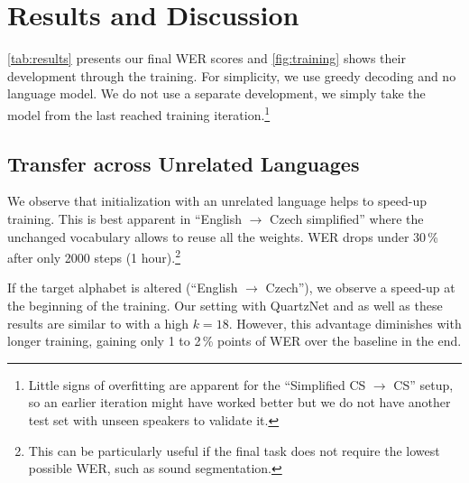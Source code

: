 \section{Results and Discussion}
\label{sec:results}


\cref{tab:results} presents our final WER scores and \cref{fig:training} shows their development through the training. For simplicity, we use greedy decoding and no language model. We do not use a separate development,
we simply take the model from the last reached training iteration.\footnote{Little signs of overfitting are apparent for the ``Simplified CS $\rightarrow$ CS'' setup, so an earlier iteration might have worked better but we do not have another test set with unseen speakers to validate it.}

\subsection{Transfer across Unrelated Languages}

We observe that initialization %
with an unrelated language helps to speed-up training. This is best apparent in ``English $\rightarrow$ Czech simplified'' where the unchanged vocabulary allows to reuse all the weights. WER drops under 30\,\%  after only 2000 steps (1 hour).\footnote{This can be particularly useful if the final task does not require the lowest possible WER, such as sound segmentation.}


If the target alphabet is altered (``English $\rightarrow$ Czech''), we observe a speed-up at the beginning of the training. Our setting with QuartzNet and as well as these results are similar to  with a high $k = 18$. %
However, this advantage diminishes with longer training, gaining only
1 to 2\,\% points of WER over the baseline in the end.

